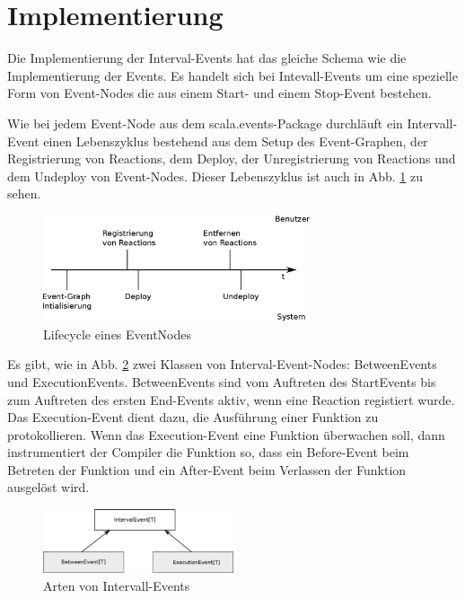 \section{Implementierung}

Die Implementierung der Interval-Events hat das gleiche Schema wie die
Implementierung der Events. Es handelt sich bei Intevall-Events um eine
spezielle Form von Event-Nodes die aus einem Start- und einem Stop-Event
bestehen.

Wie bei jedem Event-Node aus dem scala.events-Package durchläuft ein
Intervall-Event einen Lebenszyklus bestehend aus dem Setup des Event-Graphen,
der Registrierung von Reactions, dem Deploy, der Unregistrierung von Reactions
und dem Undeploy von Event-Nodes. Dieser Lebenszyklus ist auch in
Abb. \ref{event_node_lifecycle} zu sehen.

\begin{figure}[htp]
\begin{center}
  \includegraphics[width=0.7\textwidth]{graphics/EventNode-Lifecycle}
  \caption{Lifecycle eines EventNodes}
  \label{event_node_lifecycle}
\end{center}
\end{figure}


Es gibt, wie in Abb. \ref{interval_events_structure} zwei Klassen von
Interval-Event-Nodes: BetweenEvents und ExecutionEvents. BetweenEvents sind vom
Auftreten des StartEvents bis zum Auftreten des ersten End-Events aktiv, wenn
eine Reaction registiert wurde. Das Execution-Event dient dazu, die Ausführung
einer Funktion zu protokollieren. Wenn das Execution-Event eine Funktion
überwachen soll, dann instrumentiert der Compiler die Funktion so, dass ein
Before-Event beim Betreten der Funktion und ein After-Event beim Verlassen der
Funktion ausgelöst wird.

\begin{figure}[htp]
\begin{center}
  \includegraphics[width=0.5\textwidth]{graphics/interval_event_structure}
  \caption{Arten von Intervall-Events}
  \label{interval_events_structure}
\end{center}
\end{figure}


